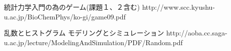 \documentclass[ %
  platex,%
  papersize,%
  twocolumn,
  landscape
]{jsarticle}
\begin{document}
\begin{thebibliography}{99}
統計力学入門の為のゲーム(課題１、２含む)
http://www.scc.kyushu-u.ac.jp/BioChemPhys/ko-gi/game09.pdf

乱数とヒストグラム モデリングとシミュレーション
http://aoba.cc.saga-u.ac.jp/lecture/ModelingAndSimulation/PDF/Random.pdf

\end{thebibliography}
\end{document}
